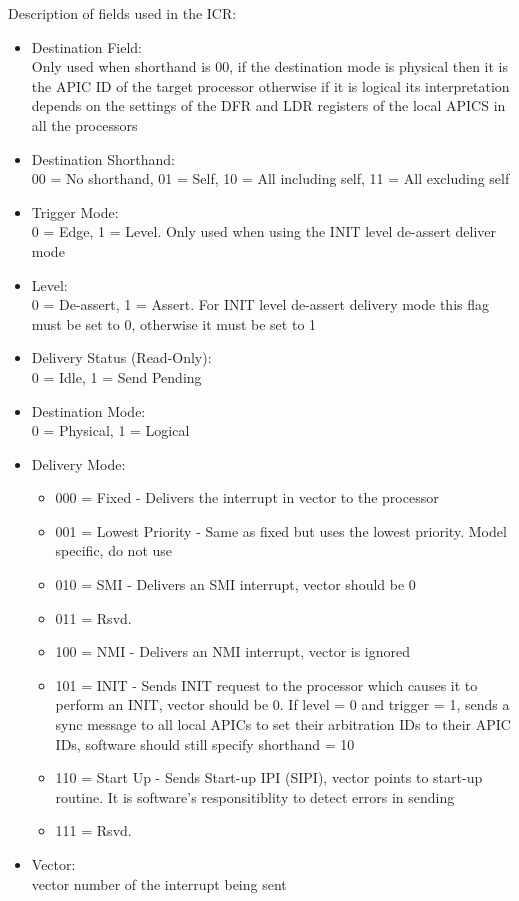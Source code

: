 \documentclass{article}
\newcommand{\layout}[1]{\parbox{\linewidth}{#1}}
\begin{document}
\layout{
  Description of fields used in the ICR:
  \begin{itemize}
    \item Destination Field: \\
      Only used when shorthand is 00, if the destination mode is physical then it is the APIC ID of the target processor otherwise if it is logical its interpretation depends on the settings of the DFR and LDR registers of the local APICS in all the processors
    \item Destination Shorthand: \\
      00 = No shorthand, 01 = Self, 10 = All including self, 11 = All excluding self
    \item Trigger Mode: \\
      0 = Edge, 1 = Level. Only used when using the INIT level de-assert deliver mode
    \item Level: \\
      0 = De-assert, 1 = Assert. For INIT level de-assert delivery mode this flag must be set to 0, otherwise it must be set to 1
    \item Delivery Status (Read-Only): \\
      0 = Idle, 1 = Send Pending
    \item Destination Mode: \\
      0 = Physical, 1 = Logical
    \item Delivery Mode: \begin{itemize}
        \item 000 = Fixed - Delivers the interrupt in vector to the processor
        \item 001 = Lowest Priority - Same as fixed but uses the lowest priority. Model specific, do not use
        \item 010 = SMI - Delivers an SMI interrupt, vector should be 0
        \item 011 = Rsvd.
        \item 100 = NMI - Delivers an NMI interrupt, vector is ignored
        \item 101 = INIT - Sends INIT request to the processor which causes it to perform an INIT, vector should be 0. If level = 0 and trigger = 1, sends a sync message to all local APICs to set their arbitration IDs to their APIC IDs, software should still specify shorthand = 10
        \item 110 = Start Up - Sends Start-up IPI (SIPI), vector points to start-up routine. It is software's responsitiblity to detect errors in sending
        \item 111 = Rsvd.
      \end{itemize}
    \item Vector: \\
      vector number of the interrupt being sent
  \end{itemize}
}
\end{document}
